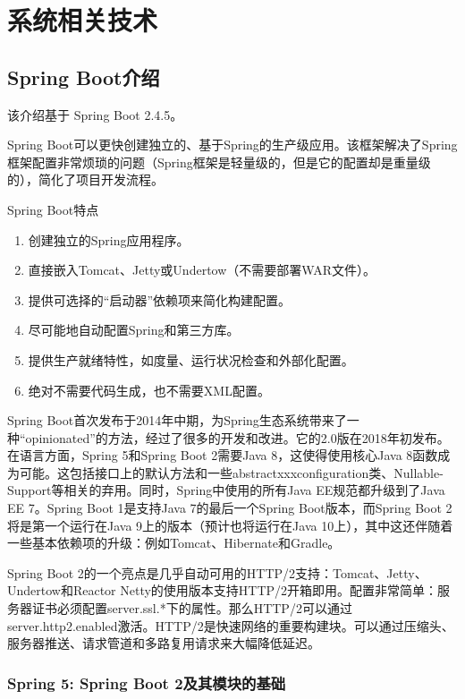 
\chapter{系统相关技术}
\label{系统相关技术}

\section{Spring Boot介绍}

该介绍基于 Spring Boot 2.4.5。

Spring Boot可以更快创建独立的、基于Spring的生产级应用。该框架解决了Spring框架配置非常烦琐的问题（Spring框架是轻量级的，但是它的配置却是重量级的），简化了项目开发流程\cite{.2019f}。

Spring Boot特点

\begin{enumerate}
  \item 创建独立的Spring应用程序。
  \item 直接嵌入Tomcat、Jetty或Undertow（不需要部署WAR文件）。
  \item 提供可选择的“启动器”依赖项来简化构建配置。
  \item 尽可能地自动配置Spring和第三方库。
  \item 提供生产就绪特性，如度量、运行状况检查和外部化配置。
  \item 绝对不需要代码生成，也不需要XML配置。
\end{enumerate}

Spring Boot首次发布于2014年中期，为Spring生态系统带来了一种“opinionated”的方法，经过了很多的开发和改进。它的2.0版在2018年初发布。 在语言方面，Spring 5和Spring Boot 2需要Java 8，这使得使用核心Java 8函数成为可能。这包括接口上的默认方法和一些abstractxxxconfiguration类、Nullable-Support等相关的弃用。同时，Spring中使用的所有Java EE规范都升级到了Java EE 7。Spring Boot 1是支持Java 7的最后一个Spring Boot版本，而Spring Boot 2将是第一个运行在Java 9上的版本（预计也将运行在Java 10上），其中这还伴随着一些基本依赖项的升级：例如Tomcat、Hibernate和Gradle。

Spring Boot 2的一个亮点是几乎自动可用的HTTP/2支持：Tomcat、Jetty、Undertow和Reactor Netty的使用版本支持HTTP/2开箱即用。配置非常简单：服务器证书必须配置server.ssl.*下的属性。那么HTTP/2可以通过server.http2.enabled激活。HTTP/2是快速网络的重要构建块。可以通过压缩头、服务器推送、请求管道和多路复用请求来大幅降低延迟。

\subsection{Spring 5: Spring Boot 2及其模块的基础}

